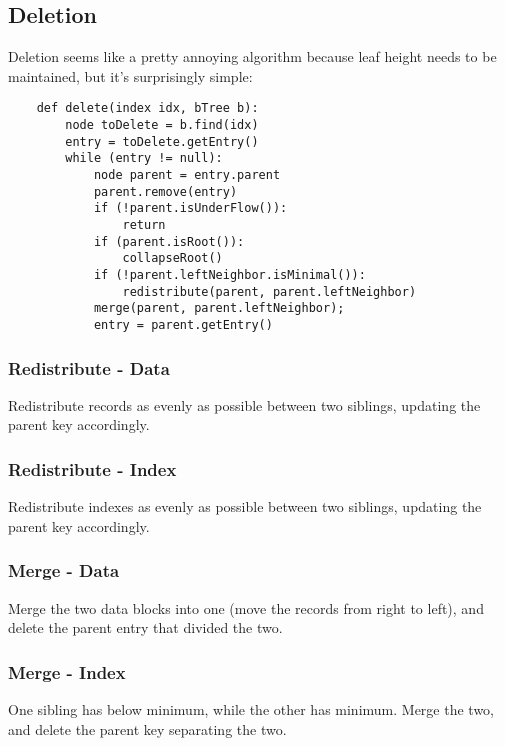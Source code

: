                 \subsection{Deletion} %
                \label{sub:deletion}
                    Deletion seems like a pretty annoying algorithm because leaf height needs to be maintained, but it's surprisingly simple:
                    \begin{verbatim}
    def delete(index idx, bTree b):
        node toDelete = b.find(idx)
        entry = toDelete.getEntry()
        while (entry != null):
            node parent = entry.parent
            parent.remove(entry)
            if (!parent.isUnderFlow()):
                return
            if (parent.isRoot()):
                collapseRoot()
            if (!parent.leftNeighbor.isMinimal()):
                redistribute(parent, parent.leftNeighbor)
            merge(parent, parent.leftNeighbor);
            entry = parent.getEntry()
                    \end{verbatim}
                    \subsubsection{Redistribute - Data} %
                    \label{ssub:redistribute_data}
                        Redistribute records as evenly as possible between two siblings, updating the parent key accordingly.
                    \subsubsection{Redistribute - Index} %
                    \label{ssub:redistribute_index}
                        Redistribute indexes as evenly as possible between two siblings, updating the parent key accordingly.
                    \subsubsection{Merge - Data} %
                    \label{ssub:merge_data}
                        Merge the two data blocks into one (move the records from right to left), and delete the parent entry that divided the two.
                    \subsubsection{Merge - Index} %
                    \label{ssub:merge_index}
                        One sibling has below minimum, while the other has minimum.
                        Merge the two, and delete the parent key separating the two.
